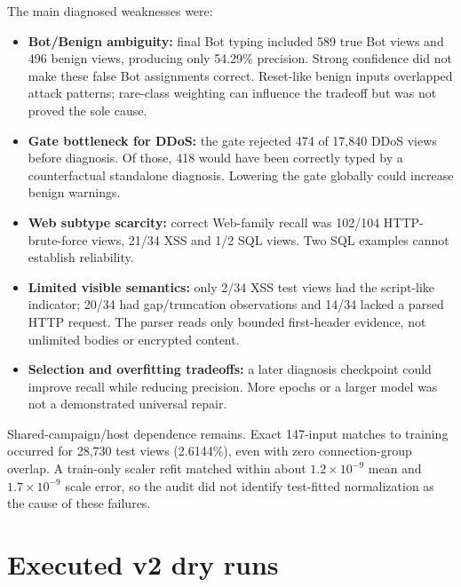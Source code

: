\documentclass[11pt,a4paper,oneside]{report}
\begin{document}
The main diagnosed weaknesses were:
\begin{itemize}
\item \textbf{Bot/Benign ambiguity:} final Bot typing included 589 true Bot views and 496 benign views, producing only 54.29\% precision. Strong confidence did not make these false Bot assignments correct. Reset-like benign inputs overlapped attack patterns; rare-class weighting can influence the tradeoff but was not proved the sole cause.
\item \textbf{Gate bottleneck for DDoS:} the gate rejected 474 of 17,840 DDoS views before diagnosis. Of those, 418 would have been correctly typed by a counterfactual standalone diagnosis. Lowering the gate globally could increase benign warnings.
\item \textbf{Web subtype scarcity:} correct Web-family recall was 102/104 HTTP-brute-force views, 21/34 XSS and 1/2 SQL views. Two SQL examples cannot establish reliability.
\item \textbf{Limited visible semantics:} only 2/34 XSS test views had the script-like indicator; 20/34 had gap/truncation observations and 14/34 lacked a parsed HTTP request. The parser reads only bounded first-header evidence, not unlimited bodies or encrypted content.
\item \textbf{Selection and overfitting tradeoffs:} a later diagnosis checkpoint could improve recall while reducing precision. More epochs or a larger model was not a demonstrated universal repair.
\end{itemize}
Shared-campaign/host dependence remains. Exact 147-input matches to training occurred for 28,730 test views (2.6144\%), even with zero connection-group overlap. A train-only scaler refit matched within about $1.2\times10^{-9}$ mean and $1.7\times10^{-9}$ scale error, so the audit did not identify test-fitted normalization as the cause of these failures.

\section{Executed v2 dry runs}
\end{document}
